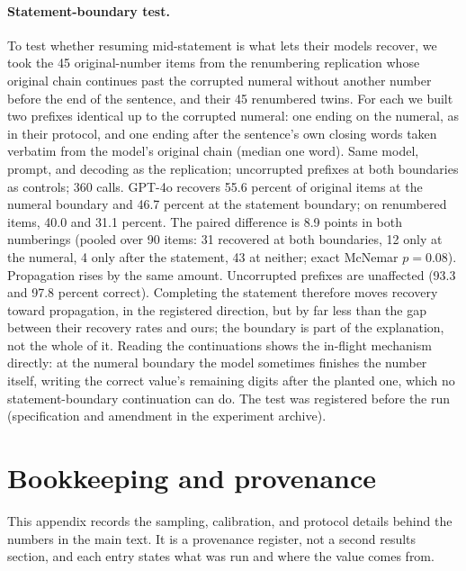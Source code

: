 \paragraph{Statement-boundary test.} To test whether resuming mid-statement is what lets their models recover, we took the 45 original-number items from the renumbering replication whose original chain continues past the corrupted numeral without another number before the end of the sentence, and their 45 renumbered twins. For each we built two prefixes identical up to the corrupted numeral: one ending on the numeral, as in their protocol, and one ending after the sentence's own closing words taken verbatim from the model's original chain (median one word). Same model, prompt, and decoding as the replication; uncorrupted prefixes at both boundaries as controls; 360 calls. GPT-4o recovers 55.6 percent of original items at the numeral boundary and 46.7 percent at the statement boundary; on renumbered items, 40.0 and 31.1 percent. The paired difference is 8.9 points in both numberings (pooled over 90 items: 31 recovered at both boundaries, 12 only at the numeral, 4 only after the statement, 43 at neither; exact McNemar $p=0.08$). Propagation rises by the same amount. Uncorrupted prefixes are unaffected (93.3 and 97.8 percent correct). Completing the statement therefore moves recovery toward propagation, in the registered direction, but by far less than the gap between their recovery rates and ours; the boundary is part of the explanation, not the whole of it. Reading the continuations shows the in-flight mechanism directly: at the numeral boundary the model sometimes finishes the number itself, writing the correct value's remaining digits after the planted one, which no statement-boundary continuation can do. The test was registered before the run (specification and amendment in the experiment archive).

\section{Bookkeeping and provenance}
\label{sec:appendix}

This appendix records the sampling, calibration, and protocol details behind
the numbers in the main text. It is a provenance register, not a second results
section, and each entry states what was run and where the value comes from.

